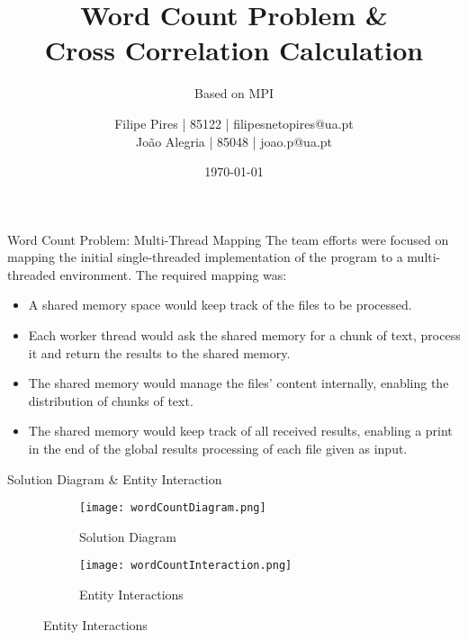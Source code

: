 \documentclass{beamer}
\title{Word Count Problem \& \\Cross Correlation Calculation}
\subtitle{Based on MPI}
\author{Filipe Pires | 85122 | filipesnetopires@ua.pt \\ João Alegria | 85048 | joao.p@ua.pt}
\institute{University of Aveiro, DETI}
\date{\today}
\begin{document}

\begin{frame}
	\maketitle %
\end{frame}


\begin{frame}{Word Count Problem: Multi-Thread Mapping}
	The team efforts were focused on mapping the initial single-threaded implementation of the program to a multi-threaded environment.
	The required mapping was:
	\begin{itemize}
		\item A shared memory space would keep track of the files to be processed.
		\item Each worker thread would ask the shared memory for a chunk of text, process it and return the results to the shared memory.
		\item The shared memory would manage the files' content internally, enabling the distribution of chunks of text.
		\item The shared memory would keep track of all received results, enabling a print in the end of the global results processing of each file given as input.
	\end{itemize}
\end{frame}


\begin{frame}{Solution Diagram \& Entity Interaction}
	\begin{figure}
		\begin{subfigure}{.49\textwidth}
			\hspace*{-.3in}
			\texttt{[image: wordCountDiagram.png]}
			\caption{Solution Diagram}
			\label{wordDiagram}
		\end{subfigure}
		\begin{subfigure}{.49\textwidth}
			\hspace*{.1in}
			\texttt{[image: wordCountInteraction.png]}
			\caption{Entity Interactions}
			\label{wordInteraction}
		\end{subfigure}
	\end{figure}
\end{frame}
\end{document}
